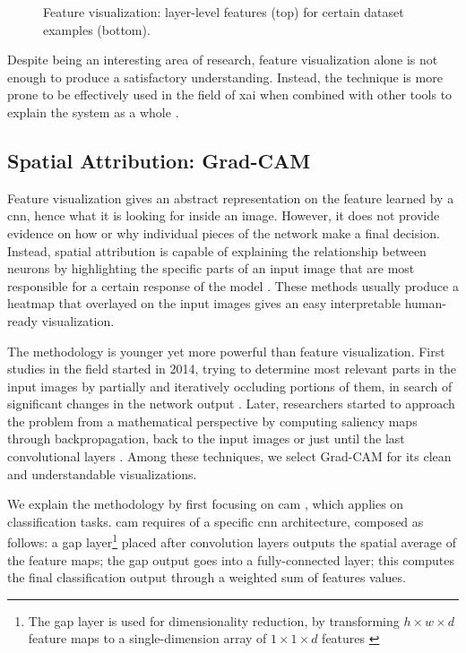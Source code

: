 \begin{figure}[!htb]
\begin{center}
\begin{subfigure}[h]{0.23\textwidth}
		\end{subfigure}
	\end{center}
	\vspace{-0.5cm}
	\caption[Feature visualization: layer-level features for certain dataset example]{Feature visualization: layer-level features (top) for certain dataset examples (bottom).}
	\label{fig:feature-visual-1}
\end{figure}

Despite being an interesting area of research, feature visualization alone is not enough to produce a satisfactory understanding. Instead, the technique is more prone to be effectively used in the field of \gls{xai} when combined with other tools to explain the system as a whole \cite{zurowietz2020intvis} \cite{olah2018the}.



\clearpage
\subsection{Spatial Attribution: Grad-CAM}
\label{subsec:gradcam-theory}

Feature visualization gives an abstract representation on the feature learned by a \gls{cnn}, hence what it is looking for inside an image. However, it does not provide evidence on how or why individual pieces of the network make a final decision. Instead, spatial attribution is capable of explaining the relationship between neurons by highlighting the specific parts of an input image that are most responsible for a certain response of the model \cite{olah2018the}. These methods usually produce a heatmap that overlayed on the input images gives an easy interpretable human-ready visualization.

The methodology is younger yet more powerful than feature visualization. First studies in the field started in 2014, trying to determine most relevant parts in the input images by partially and iteratively occluding portions of them, in search of significant changes in the network output \cite{zeiler2013visualizing}. Later, researchers started to approach the problem from a mathematical perspective by computing saliency maps through backpropagation, back to the input images \cite{simonyan2014deep} or just until the last convolutional layers \cite{zhou2015learning}. Among these techniques, we select Grad-CAM \cite{Selvaraju_2019} for its clean and understandable visualizations.

\medskip

We explain the methodology by first focusing on \gls{cam} \cite{zhou2015learning}, which applies on classification tasks. \gls{cam} requires of a specific \gls{cnn} architecture, composed as follows: a \gls{gap} layer\footnote{The \gls{gap} layer is used for dimensionality reduction, by transforming $h \times w \times d$ feature maps to a single-dimension array of $1 \times 1 \times d$ features \cite{gap_layers}} placed after convolution layers outputs the spatial average of the feature maps; the \gls{gap} output goes into a fully-connected layer; this computes the final classification output through a weighted sum of features values.

